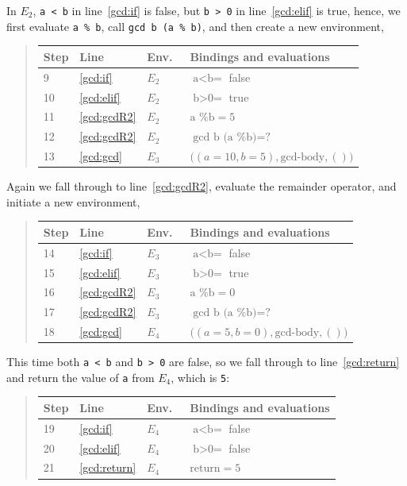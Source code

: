 \documentclass[fsharpNotes.tex]{subfiles}
\begin{document}
In $E_2$, \lstinline!a < b! in line~\ref{gcd:if} is false, but
\lstinline!b > 0! in line~\ref{gcd:elif} is true, hence, we first
evaluate \lstinline{a % b}, call \lstinline{gcd b (a % b)}, and then create a new environment,
\begin{quote}
  \begin{tabular*}{0.6\linewidth}{l|lll}
    Step & Line & Env.\ & Bindings and evaluations\\
    \hline
    9&\ref{gcd:if} & $E_2$ &$\text{a<b} =$ false\\
    10&\ref{gcd:elif} & $E_2$ &$\text{b>0} =$ true\\
    11&\ref{gcd:gcdR2} & $E_2$ & $\text{a \% b} = 5$\\
    12&\ref{gcd:gcdR2} & $E_2$ & $\text{gcd b (a \% b)} = \text{?}$\\
    13&\ref{gcd:gcd} & $E_3$ &$\big((a = 10, b = 5), \text{gcd-body}, ()\big)$\\
  \end{tabular*}
\end{quote}
Again we fall through to line~\ref{gcd:gcdR2}, evaluate the remainder operator, and initiate a new environment,
\begin{quote}
  \begin{tabular*}{0.6\linewidth}{l|lll}
    Step & Line & Env.\ & Bindings and evaluations\\
    \hline
    14&\ref{gcd:if} & $E_3$ &$\text{a<b} =$ false\\
    15&\ref{gcd:elif} & $E_3$ &$\text{b>0} =$ true\\
    16&\ref{gcd:gcdR2} & $E_3$ & $\text{a \% b} = 0$\\
    17&\ref{gcd:gcdR2} & $E_3$ & $\text{gcd b (a \% b)} = \text{?}$\\
    18&\ref{gcd:gcd} & $E_4$ & $\big((a = 5, b = 0), \text{gcd-body}, ()\big)$\\
  \end{tabular*}
\end{quote}
This time both \lstinline!a < b! and \lstinline!b > 0! are false, so we fall through to line~\ref{gcd:return} and return the value of \lstinline!a! from $E_4$, which is \lstinline!5!:
\begin{quote}
  \begin{tabular*}{0.6\linewidth}{l|lll}
    Step & Line & Env.\ & Bindings and evaluations\\
    \hline
    19&\ref{gcd:if} & $E_4$ &$\text{a<b} =$ false\\
    20&\ref{gcd:elif} & $E_4$ &$\text{b>0} =$ false\\
    21&\ref{gcd:return} & $E_4$ & $\text{return} = 5$\\
  \end{tabular*}
\end{quote}
\end{document}
